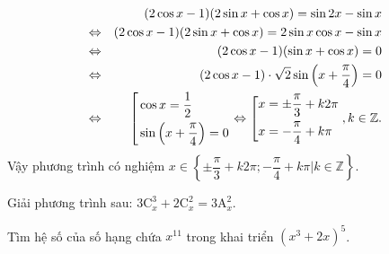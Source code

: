 \begin{bt}
{\begin{enumerate}
{\begin{eqnarray*}
					& & (2\cos x-1)(2\sin x+\cos x)=\sin 2x-\sin x\\ &\Leftrightarrow& (2\cos x-1)(2\sin x+\cos x)=2\sin x\cos x-\sin x \\
					&\Leftrightarrow& (2\cos x-1)(\sin x+\cos x)=0 \\
					&\Leftrightarrow& (2\cos x-1)\cdot\sqrt{2}\sin\left(x+\dfrac{\pi}{4}\right)=0 \\
					&\Leftrightarrow& \left[\begin{aligned}&\cos x=\dfrac{1}{2} \\ &\sin\left(x+\dfrac{\pi}{4}\right)=0\end{aligned}\right. \Leftrightarrow \left[\begin{aligned}&x=\pm\dfrac{\pi}{3}+k2\pi \\ &x=-\dfrac{\pi}{4}+k\pi\end{aligned}\right.,k\in\mathbb{Z}.
				\end{eqnarray*}
			}
			Vậy phương trình có nghiệm $x\in\left\{\pm\dfrac{\pi}{3}+k2\pi;-\dfrac{\pi}{4}+k\pi\Big|k\in\mathbb{Z}\right\}$.
		\end{enumerate}
	}
\end{bt}

\begin{bt}%
	Giải phương trình sau: $3\mathrm{C}_x^3+2\mathrm{C}_x^2=3\mathrm{A}_x^2$.
\end{bt}

\begin{bt}%
	Tìm hệ số của số hạng chứa $x^{11}$ trong khai triển $\left(x^3+2x\right)^5$.
\end{bt}

